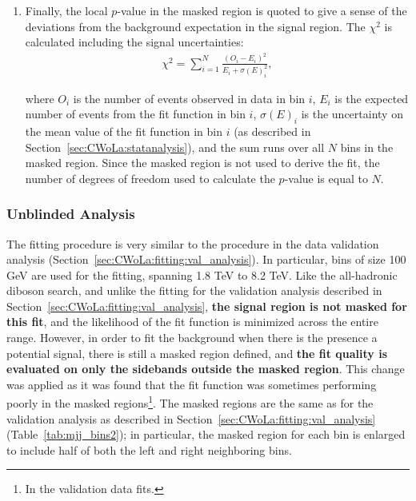 \begin{enumerate}
\item Finally, the local $p$-value in the masked region is quoted to give a sense of the deviations from the background expectation in the signal region.
The $\chi^2$ is calculated including the signal uncertainties:
\begin{align}
  \chi^2=\sum_{i=1}^N \frac{(O_i-E_i)^2}{E_i+\sigma(E)^2_i},
\end{align}

\noindent where $O_i$ is the number of events observed in data in bin $i$, $E_i$ is the expected number of events from the fit function in bin $i$, $\sigma(E)_i$ is the uncertainty on the mean value of the fit function in bin $i$ (as described in Section~\ref{sec:CWoLa:statanalysis}), and the sum runs over all $N$ bins in the masked region.
Since the masked region is not used to derive the fit, the number of degrees of freedom used to calculate the $p$-value is equal to $N$.

\end{enumerate}

\subsubsection{Unblinded Analysis}
\label{sec:CWoLa:fitting:unblinded}
The fitting procedure is very similar to the procedure in the data validation analysis (Section~\ref{sec:CWoLa:fitting:val_analysis}).
In particular, bins of size 100 GeV are used for the fitting, spanning 1.8 TeV to 8.2 TeV.
Like the all-hadronic diboson search, and unlike the fitting for the validation analysis described in Section~\ref{sec:CWoLa:fitting:val_analysis}, \textbf{the signal region is not masked for this fit}, and the likelihood of the fit function is minimized across the entire range.
However, in order to fit the background when there is the presence a potential signal, there is still a masked region defined, and \textbf{the fit quality is evaluated on only the sidebands outside the masked region}.
This change was applied as it was found that the fit function was sometimes performing poorly in the masked regions\footnote{In the validation data fits.}.
The masked regions are the same as for the validation analysis as described in Section~\ref{sec:CWoLa:fitting:val_analysis} (Table~\ref{tab:mjj_bins2}); in particular, the masked region for each bin is enlarged to include half of both the left and right neighboring bins.


